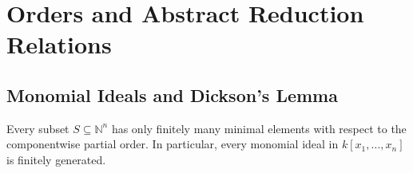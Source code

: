 \chapter{Orders and Abstract Reduction Relations} 

\section{Monomial Ideals and Dickson’s Lemma}
\begin{corollary}\label{cor:Dickson}
    Every subset $S\subseteq \mathbb{N}^n$ has only finitely many minimal elements with respect to the componentwise partial order. 
    In particular, every monomial ideal in $k[x_1,\dots,x_n]$ is finitely generated.
\end{corollary}